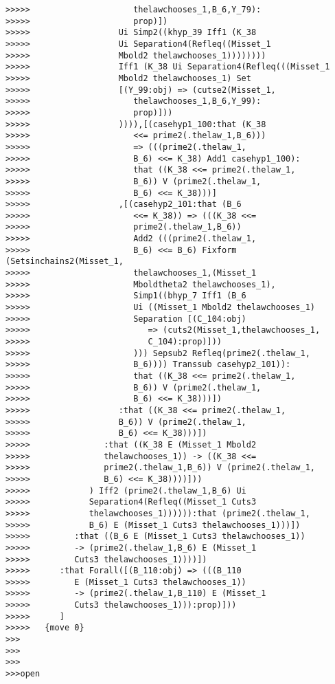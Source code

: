\documentclass[12pt]{article}
\begin{document}
\begin{verbatim}
>>>>>                     thelawchooses_1,B_6,Y_79):
>>>>>                     prop)])
>>>>>                  Ui Simp2((khyp_39 Iff1 (K_38
>>>>>                  Ui Separation4(Refleq((Misset_1
>>>>>                  Mbold2 thelawchooses_1))))))))
>>>>>                  Iff1 (K_38 Ui Separation4(Refleq(((Misset_1
>>>>>                  Mbold2 thelawchooses_1) Set
>>>>>                  [(Y_99:obj) => (cutse2(Misset_1,
>>>>>                     thelawchooses_1,B_6,Y_99):
>>>>>                     prop)]))
>>>>>                  )))),[(casehyp1_100:that (K_38
>>>>>                     <<= prime2(.thelaw_1,B_6)))
>>>>>                     => (((prime2(.thelaw_1,
>>>>>                     B_6) <<= K_38) Add1 casehyp1_100):
>>>>>                     that ((K_38 <<= prime2(.thelaw_1,
>>>>>                     B_6)) V (prime2(.thelaw_1,
>>>>>                     B_6) <<= K_38)))]
>>>>>                  ,[(casehyp2_101:that (B_6
>>>>>                     <<= K_38)) => (((K_38 <<=
>>>>>                     prime2(.thelaw_1,B_6))
>>>>>                     Add2 (((prime2(.thelaw_1,
>>>>>                     B_6) <<= B_6) Fixform (Setsinchains2(Misset_1,
>>>>>                     thelawchooses_1,(Misset_1
>>>>>                     Mboldtheta2 thelawchooses_1),
>>>>>                     Simp1((bhyp_7 Iff1 (B_6
>>>>>                     Ui ((Misset_1 Mbold2 thelawchooses_1)
>>>>>                     Separation [(C_104:obj)
>>>>>                        => (cuts2(Misset_1,thelawchooses_1,
>>>>>                        C_104):prop)]))
>>>>>                     ))) Sepsub2 Refleq(prime2(.thelaw_1,
>>>>>                     B_6)))) Transsub casehyp2_101)):
>>>>>                     that ((K_38 <<= prime2(.thelaw_1,
>>>>>                     B_6)) V (prime2(.thelaw_1,
>>>>>                     B_6) <<= K_38)))])
>>>>>                  :that ((K_38 <<= prime2(.thelaw_1,
>>>>>                  B_6)) V (prime2(.thelaw_1,
>>>>>                  B_6) <<= K_38)))])
>>>>>               :that ((K_38 E (Misset_1 Mbold2
>>>>>               thelawchooses_1)) -> ((K_38 <<=
>>>>>               prime2(.thelaw_1,B_6)) V (prime2(.thelaw_1,
>>>>>               B_6) <<= K_38))))]))
>>>>>            ) Iff2 (prime2(.thelaw_1,B_6) Ui
>>>>>            Separation4(Refleq((Misset_1 Cuts3
>>>>>            thelawchooses_1)))))):that (prime2(.thelaw_1,
>>>>>            B_6) E (Misset_1 Cuts3 thelawchooses_1)))])
>>>>>         :that ((B_6 E (Misset_1 Cuts3 thelawchooses_1))
>>>>>         -> (prime2(.thelaw_1,B_6) E (Misset_1
>>>>>         Cuts3 thelawchooses_1))))])
>>>>>      :that Forall([(B_110:obj) => (((B_110
>>>>>         E (Misset_1 Cuts3 thelawchooses_1))
>>>>>         -> (prime2(.thelaw_1,B_110) E (Misset_1
>>>>>         Cuts3 thelawchooses_1))):prop)]))
>>>>>      ]
>>>>>   {move 0}
>>>
>>>
>>>
>>>open


\end{verbatim}
\end{document}
